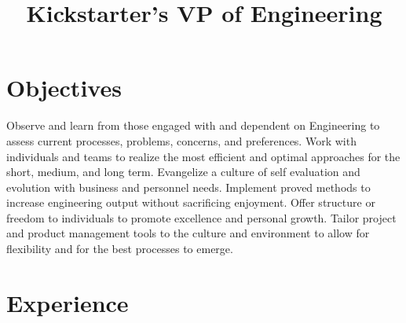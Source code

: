 \documentclass[11pt,letterpaper,roman]{moderncv}
\title{Kickstarter's VP of Engineering}
\begin{document}
\makecvtitle
\renewcommand{\thefootnote}{\fnsymbol{footnote}}


\section{Objectives}
Observe and learn from those engaged with and dependent on Engineering to assess current processes, problems, concerns, and preferences.  Work with individuals and teams to realize the most efficient and optimal approaches for the short, medium, and long term.  Evangelize a culture of self evaluation and evolution with business and personnel needs.  Implement proved methods to increase engineering output without sacrificing enjoyment.  Offer structure or freedom to individuals to promote excellence and personal growth.  Tailor project and product management tools to the culture and environment to allow for flexibility and for the best processes to emerge.


\section{Experience}

\end{document}
